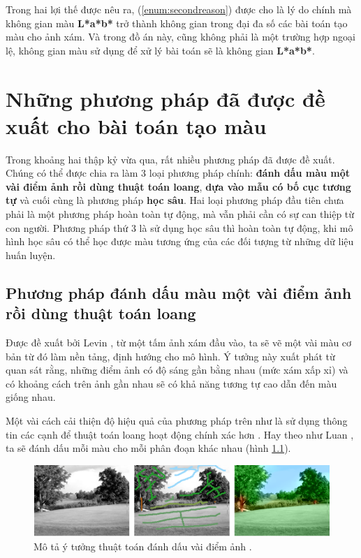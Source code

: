 \documentclass[a4paper, 12pt]{report}
\begin{document}
Trong hai lợi thế được nêu ra, (\ref{enum:secondreason}) được cho là lý do chính mà không gian màu \textbf{L*a*b*} trở thành không gian trong đại đa số các bài toán tạo màu cho ảnh xám.
Và trong đồ án này, cũng không phải là một trường hợp ngoại lệ, không gian màu sử dụng để xử lý bài toán sẽ là không gian \textbf{L*a*b*}.

\chapter{Những phương pháp đã được đề xuất cho bài toán tạo màu}\label{proposedmethods}

Trong khoảng hai thập kỷ vừa qua, rất nhiều phương pháp đã được đề xuất.
Chúng có thể được chia ra làm 3 loại phương pháp chính: \textbf{đánh dấu màu một vài điểm ảnh rồi dùng thuật toán loang}, \textbf{dựa vào mẫu có bố cục tương tự} và cuối cùng là phương pháp \textbf{học sâu}.
Hai loại phương pháp đầu tiên chưa phải là một phương pháp hoàn toàn tự động, mà vẫn phải cần có sự can thiệp từ con người.
Phương pháp thứ 3 là sử dụng học sâu thì hoàn toàn tự động, khi mô hình học sâu có thể học được màu tương ứng của các đối tượng từ những dữ liệu huấn luyện.

\section{Phương pháp đánh dấu màu một vài điểm ảnh rồi dùng thuật toán loang}\label{scribblemethods}

Được đề xuất bởi Levin \cite{alevincolorization}, từ một tấm ảnh xám đầu vào, ta sẽ vẽ một vài màu cơ bản từ đó làm nền tảng, định hướng cho mô hình.
Ý tưởng này xuất phát từ quan sát rằng, những điểm ảnh có độ sáng gần bằng nhau (mức xám xấp xỉ) và có khoảng cách trên ảnh gần nhau sẽ có khả năng tương tự cao dẫn đến màu giống nhau.\vspace{5pt}

Một vài cách cải thiện độ hiệu quả của phương pháp trên như là sử dụng thông tin các cạnh để thuật toán loang hoạt động chính xác hơn \cite{huangcolorization}.
Hay theo như Luan \cite{luancolorization}, ta sẽ đánh dấu mỗi màu cho mỗi phân đoạn khác nhau (hình \ref{fig:scribblemethod}). 

\begin{figure}[!h]
\captionsetup{width=0.8\textwidth}
\centering
\includegraphics[width=15cm]{images/2_4.png}
\caption{Mô tả ý tưởng thuật toán đánh dấu vài điểm ảnh \cite{trungcolorization2018}.}
\label{fig:scribblemethod}
\end{figure}
\end{document}
